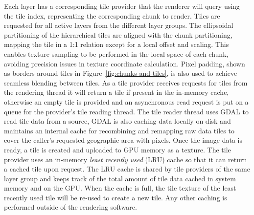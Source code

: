 \documentclass[journal]{vgtc}                %
\newcommand{\fig}[1]{Figure~\ref{fig:#1}}
\begin{document}
Each layer has a corresponding tile provider that the renderer will query using the tile index, representing the corresponding chunk to render.
Tiles are requested for all active layers from the different layer groups.
The ellipsoidal partitioning of the hierarchical tiles are aligned with the chunk partitioning, mapping the tile in a 1:1 relation except for a local offset and scaling. This enables texture sampling to be performed in the local space of each chunk, avoiding precision issues in texture coordinate calculation. Pixel padding, shown as borders around tiles in \fig{chunks-and-tiles}, is also used to achieve seamless blending between tiles.
As a tile provider receives requests for tiles from the rendering thread it will return a tile if present in the in-memory cache, otherwise an empty tile is provided and an asynchronous read request is put on a queue for the provider's tile reading thread.
The tile reader thread uses GDAL to read tile data from a source, GDAL is also caching data locally on disk and maintains an internal cache for recombining and remapping raw data tiles to cover the caller's requested geographic area with pixels.
Once the image data is ready, a tile is created and uploaded to GPU memory as a texture.
The tile provider uses an in-memory \emph{least recently used} (LRU) cache so that it can return a cached tile upon request.
The LRU cache is shared by tile providers of the same layer group and keeps track of the total amount of tile data cached in system memory and on the GPU. When the cache is full, the tile texture of the least recently used tile will be re-used to create a new tile.
Any other caching is performed outside of the rendering software.

\end{document}
